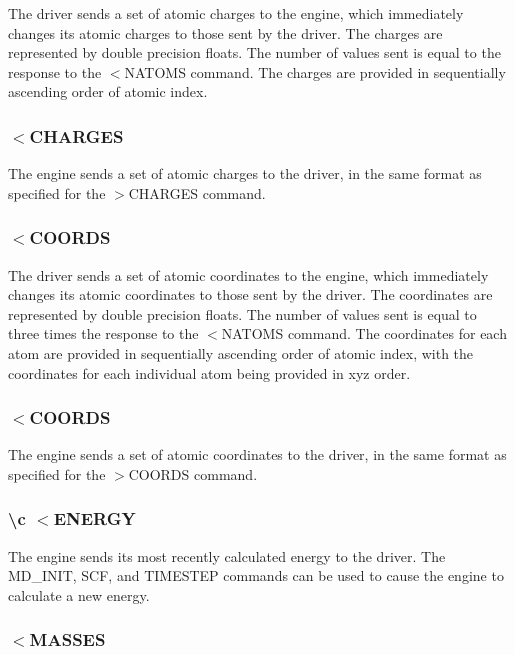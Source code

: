 The driver sends a set of atomic charges to the engine, which immediately changes its atomic charges to those sent by the driver. The charges are represented by double precision floats. The number of values sent is equal to the response to the $<$N\-A\-T\-O\-M\-S command. The charges are provided in sequentially ascending order of atomic index.\hypertarget{index_recv_charges}{}\subsubsection{$<$\-C\-H\-A\-R\-G\-E\-S}\label{index_recv_charges}
The engine sends a set of atomic charges to the driver, in the same format as specified for the {\ttfamily $>$C\-H\-A\-R\-G\-E\-S} command.\hypertarget{index_send_coords}{}\subsubsection{$<$\-C\-O\-O\-R\-D\-S}\label{index_send_coords}
The driver sends a set of atomic coordinates to the engine, which immediately changes its atomic coordinates to those sent by the driver. The coordinates are represented by double precision floats. The number of values sent is equal to three times the response to the $<$N\-A\-T\-O\-M\-S command. The coordinates for each atom are provided in sequentially ascending order of atomic index, with the coordinates for each individual atom being provided in xyz order.\hypertarget{index_send_coords}{}\subsubsection{$<$\-C\-O\-O\-R\-D\-S}\label{index_send_coords}
The engine sends a set of atomic coordinates to the driver, in the same format as specified for the {\ttfamily $>$C\-O\-O\-R\-D\-S} command.\hypertarget{index_recv_energy}{}\subsubsection{\textbackslash{}c $<$\-E\-N\-E\-R\-G\-Y}\label{index_recv_energy}
The engine sends its most recently calculated energy to the driver. The {\ttfamily M\-D\-\_\-\-I\-N\-I\-T}, {\ttfamily S\-C\-F}, and {\ttfamily T\-I\-M\-E\-S\-T\-E\-P} commands can be used to cause the engine to calculate a new energy.\hypertarget{index_recv_masses}{}\subsubsection{$<$\-M\-A\-S\-S\-E\-S}\label{index_recv_masses}
